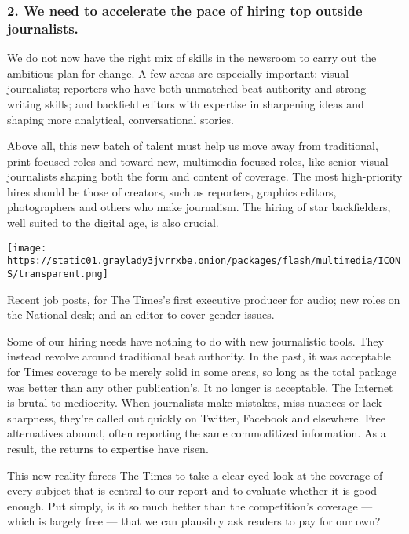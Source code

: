 \hypertarget{2-we-need-to-accelerate-the-pace-of-hiring-top-outside-journalists}{%
\subsubsection{2. We need to accelerate the pace of hiring top outside
journalists.}\label{2-we-need-to-accelerate-the-pace-of-hiring-top-outside-journalists}}

We do not now have the right mix of skills in the newsroom to carry out
the ambitious plan for change. A few areas are especially important:
visual journalists; reporters who have both unmatched beat authority and
strong writing skills; and backfield editors with expertise in
sharpening ideas and shaping more analytical, conversational stories.

Above all, this new batch of talent must help us move away from
traditional, print-focused roles and toward new, multimedia-focused
roles, like senior visual journalists shaping both the form and content
of coverage. The most high-priority hires should be those of creators,
such as reporters, graphics editors, photographers and others who make
journalism. The hiring of star backfielders, well suited to the digital
age, is also crucial.

\texttt{[image: https://static01.graylady3jvrrxbe.onion/packages/flash/multimedia/ICONS/transparent.png]}

Recent job posts, for The Times's first executive producer for audio;
\href{https://www.nytimes3xbfgragh.onion/interactive/2017/01/11/jobs/nyt-job-national-desk.html}{new
roles on the National desk}; and an editor to cover gender issues.

Some of our hiring needs have nothing to do with new journalistic tools.
They instead revolve around traditional beat authority. In the past, it
was acceptable for Times coverage to be merely solid in some areas, so
long as the total package was better than any other publication's. It no
longer is acceptable. The Internet is brutal to mediocrity. When
journalists make mistakes, miss nuances or lack sharpness, they're
called out quickly on Twitter, Facebook and elsewhere. Free alternatives
abound, often reporting the same commoditized information. As a result,
the returns to expertise have risen.

This new reality forces The Times to take a clear-eyed look at the
coverage of every subject that is central to our report and to evaluate
whether it is good enough. Put simply, is it so much better than the
competition's coverage --- which is largely free --- that we can
plausibly ask readers to pay for our own?

